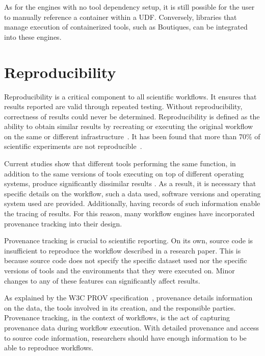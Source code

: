             As for the engines with no tool dependency setup, it is still
            possible for the user to manually reference a container within a
            UDF. Conversely, libraries that manage execution of containerized
            tools, such as Boutiques, can be integrated into these engines.

    \section{Reproducibility}\label{reproducibility} Reproducibility is a
        critical component to all scientific workflows. It ensures that results
        reported are valid through repeated testing. Without reproducibility,
        correctness of results could never be determined. Reproducibility is
        defined as the ability to obtain similar results by recreating or
        executing the original workflow on the same or different
        infrastructure~\cite{Peng1226}. It has been found that more than 70\% of
        scientific experiments are not reproducible~\cite{baker2016there}. 

        Current studies show that different tools performing the same function,
        in addition to the same versions of tools executing on top of different
        operating systems, produce significantly dissimilar results
        \cite{bowring:inserm-01760535, 10.1371/journal.pone.0038234,
        10.3389/fninf.2015.00012}. As a result, it is necessary that specific
        details on the workflow, such a data used, software versions and
        operating system used are provided. Additionally, having records of such
        information enable the tracing of results. For this reason, many
        workflow engines have incorporated provenance tracking into their
        design.

            Provenance tracking is crucial to scientific reporting. On its own,
            source code is insufficient to reproduce the workflow described in a
            research paper. This is because source code does not specify the
            specific dataset used nor the specific versions of tools and the
            environments that they were executed on. Minor changes to any of
            these features can significantly affect results.

            As explained by the W3C PROV specification~\cite{missier2013w3c},
            provenance details information on the data, the tools involved in
            its creation, and the responsible parties. Provenance tracking, in
            the context of workflows, is the act of capturing provenance data
            during workflow execution. With detailed provenance and access to
            source code information, researchers should have enough information
            to be able to reproduce workflows. 

